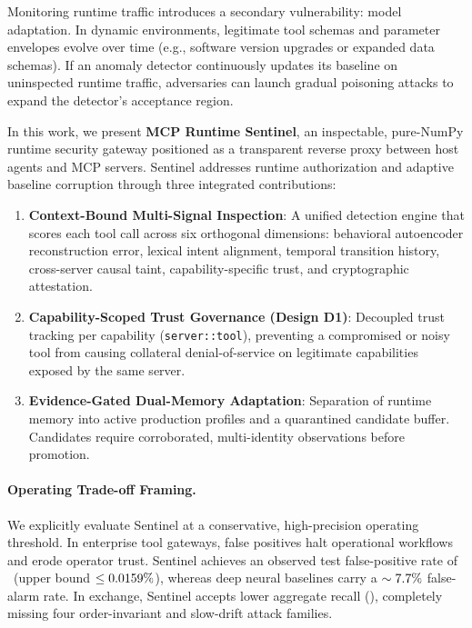 \documentclass{llncs}
\begin{document}
Monitoring runtime traffic introduces a secondary vulnerability: model adaptation. In dynamic environments, legitimate tool schemas and parameter envelopes evolve over time (e.g., software version upgrades or expanded data schemas). If an anomaly detector continuously updates its baseline on uninspected runtime traffic, adversaries can launch gradual poisoning attacks to expand the detector's acceptance region.

In this work, we present \textbf{MCP Runtime Sentinel}, an inspectable, pure-NumPy runtime security gateway positioned as a transparent reverse proxy between host agents and MCP servers. Sentinel addresses runtime authorization and adaptive baseline corruption through three integrated contributions:
\begin{enumerate}
    \item \textbf{Context-Bound Multi-Signal Inspection}: A unified detection engine that scores each tool call across six orthogonal dimensions: behavioral autoencoder reconstruction error, lexical intent alignment, temporal transition history, cross-server causal taint, capability-specific trust, and cryptographic attestation.
    \item \textbf{Capability-Scoped Trust Governance (Design D1)}: Decoupled trust tracking per capability (\texttt{server::tool}), preventing a compromised or noisy tool from causing collateral denial-of-service on legitimate capabilities exposed by the same server.
    \item \textbf{Evidence-Gated Dual-Memory Adaptation}: Separation of runtime memory into active production profiles and a quarantined candidate buffer. Candidates require corroborated, multi-identity observations before promotion.
\end{enumerate}

\paragraph{Operating Trade-off Framing.} We explicitly evaluate Sentinel at a conservative, high-precision operating threshold. In enterprise tool gateways, false positives halt operational workflows and erode operator trust. Sentinel achieves an observed test false-positive rate of \SentinelObservedFPR\ (upper bound $\le 0.0159\%$), whereas deep neural baselines carry a $\sim7.7\%$ false-alarm rate. In exchange, Sentinel accepts lower aggregate recall (\SentinelRecall), completely missing four order-invariant and slow-drift attack families.
\end{document}
